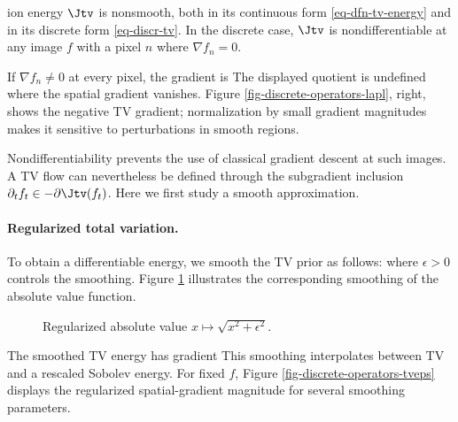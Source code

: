 ion energy $\Jtv$ is nonsmooth, both in its continuous form \eqref{eq-dfn-tv-energy} and in its discrete form \eqref{eq-discr-tv}. In the discrete case, $\Jtv$ is nondifferentiable at any image $f$ with a pixel $n$ where $\nabla f_n = 0$.

If $\nabla f_n\neq0$ at every pixel, the gradient is
The displayed quotient is undefined where the spatial gradient vanishes. Figure \ref{fig-discrete-operators-lapl}, right, shows the negative TV gradient; normalization by small gradient magnitudes makes it sensitive to perturbations in smooth regions.

Nondifferentiability prevents the use of classical gradient descent at such images. A TV flow can nevertheless be defined through the subgradient inclusion $\partial_t f_t\in-\partial\Jtv(f_t)$. Here we first study a smooth approximation.

  
\paragraph{Regularized total variation.}
	
To obtain a differentiable energy, we smooth the TV prior as follows:
where $\epsilon>0$ controls the smoothing. Figure \ref{fig-regul-abs} illustrates the corresponding smoothing of the absolute value function.


\begin{figure}[tbp]
\centering
{}\hfill
{}
\caption{Regularized absolute value $x \mapsto \sqrt{x^2+\epsilon^2}$.}
\label{fig-regul-abs}
\end{figure}

The smoothed TV energy has gradient
This smoothing interpolates between TV and a rescaled Sobolev energy. For fixed $f$,
Figure \ref{fig-discrete-operators-tveps} displays the regularized spatial-gradient magnitude for several smoothing parameters.

